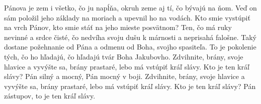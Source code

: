 Pánova je zem i všetko, čo ju napĺňa,
okruh zeme aj tí, čo bývajú na ňom.
\versseparator
Veď on sám položil jeho základy na moriach
a upevnil ho na vodách.
\versseparator
Kto smie vystúpiť na vrch Pánov,
kto smie stáť na jeho mieste posvätnom?
\versseparator
Ten, čo má ruky nevinné a srdce čisté,
čo nedvíha svoju dušu k márnosti
a neprisahá falošne.
\versseparator
Taký dostane požehnanie od Pána
a odmenu od Boha, svojho spasiteľa.
\versseparator
To je pokolenie tých, čo ho hľadajú,
čo hľadajú tvár Boha Jakubovho.
\versseparator
Zdvihnite, brány, svoje hlavice
a vyvýšte sa, brány prastaré,
lebo má vstúpiť kráľ slávy.
\versseparator
Kto je ten kráľ slávy?
Pán silný a mocný,
Pán mocný v boji.
\versseparator
Zdvihnite, brány, svoje hlavice
a vyvýšte sa, brány prastaré,
lebo má vstúpiť kráľ slávy.
\versseparator
Kto je ten kráľ slávy?
Pán zástupov, to je ten kráľ slávy.
